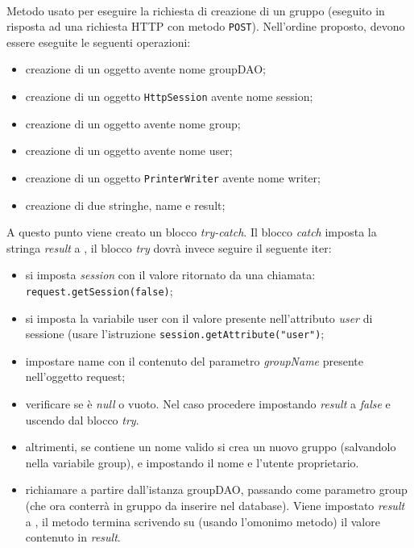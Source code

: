 \begin{description}
	\item{}\\	
	Metodo usato per eseguire la richiesta di creazione di un gruppo (eseguito in risposta ad una richiesta HTTP con metodo \texttt{POST}). Nell'ordine proposto, devono essere eseguite le seguenti operazioni:
	\begin{itemize}
		\item creazione di un oggetto  avente nome groupDAO;
		\item creazione di un oggetto \texttt{HttpSession} avente nome session;
		\item creazione di un oggetto  avente nome group;
		\item creazione di un oggetto  avente nome user;
		\item creazione di un oggetto \texttt{PrinterWriter} avente nome writer;
		\item creazione di due stringhe, name e result;
	\end{itemize}
	A questo punto viene creato un blocco \textit{try-catch}. Il blocco \textit{catch} imposta la stringa \textit{result} a , il blocco \textit{try} dovrà invece seguire il seguente iter:
	\begin{itemize}
		\item si imposta \textit{session} con il valore ritornato da una chiamata:\\
		\verb|request.getSession(false)|;
		\item si imposta la variabile user con il valore presente nell'attributo \textit{user} di sessione (usare l'istruzione \verb|session.getAttribute("user")|;
		\item impostare name con il contenuto del parametro \textit{groupName} presente nell'oggetto request;
		\item verificare se  è \textit{null} o vuoto. Nel caso procedere impostando \textit{result} a \textit{false} e uscendo dal blocco \textit{try}.
		\item altrimenti, se  contiene un nome valido si crea un nuovo gruppo (salvandolo nella variabile group), e impostando il nome e l'utente proprietario.
		\item richiamare  a partire dall'istanza groupDAO, passando come parametro group (che ora conterrà in gruppo da inserire nel database). Viene impostato \textit{result} a ,
	il metodo termina scrivendo su  (usando l'omonimo metodo) il valore contenuto in \textit{result}. 		
	\end{itemize}
	
\end{description}

